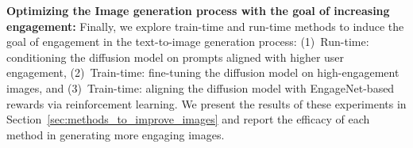  
 
 
 

 

 \textbf{Optimizing the Image generation process with the goal of increasing engagement:} Finally, we explore train-time and run-time methods to induce the goal of engagement in the text-to-image generation process: (1)~Run-time: conditioning the diffusion model on prompts aligned with higher user engagement, (2)~Train-time: fine-tuning the diffusion model on high-engagement images, and (3)~Train-time: aligning the diffusion model with EngageNet-based rewards via reinforcement learning. We present the results of these experiments in Section~\ref{sec:methods_to_improve_images} and report the efficacy of each method in generating more engaging images. 

